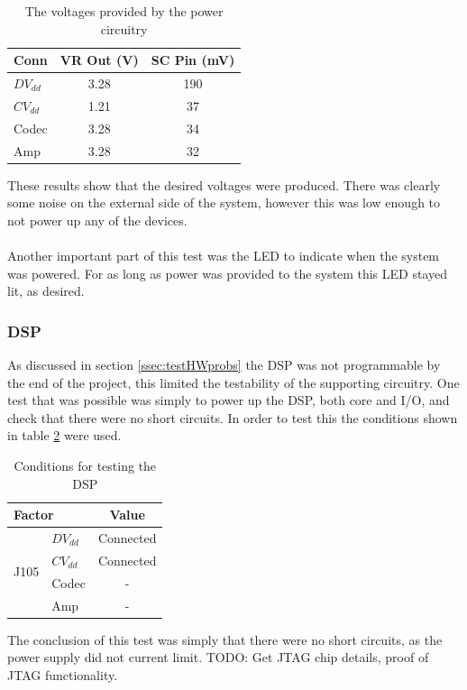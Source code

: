 \begin{table}[H]
	\centering
	\begin{tabular}[c]{| l | c | c |}
		\hline
		Conn		& VR Out (V)	& SC Pin (mV)	\\
		\hline
		$DV_{dd}$	& 3.28		& 190		\\
		$CV_{dd}$	& 1.21		& 37		\\
		Codec		& 3.28		& 34		\\
		Amp		& 3.28		& 32		\\
		\hline
	\end{tabular}
	\caption{The voltages provided by the power circuitry}
	\label{tab:powisotest}
\end{table}

\noindent These results show that the desired voltages were produced.
There was clearly some noise on the external side of the system, however this was low enough to not power up any of the devices.
\\
\\
Another important part of this test was the LED to indicate when the system was powered.
For as long as power was provided to the system this LED stayed lit, as desired.

\subsubsection{DSP}
As discussed in section \ref{ssec:testHWprobs} the DSP was not programmable by the end of the project, this limited the testability of the supporting circuitry.
One test that was possible was simply to power up the DSP, both core and I/O, and check that there were no short circuits.
In order to test this the conditions shown in table \ref{tab:dsptestconditions} were used.

\begin{table}[H]
	\centering
	\begin{tabular}[c]{| l | l | c |}
		\hline
		\multicolumn{2}{|l|}{Factor}		& Value	\\
		\hline
		\multirow{4}{*}{J105}	& $DV_{dd}$	& Connected	\\
					& $CV_{dd}$	& Connected	\\
					& Codec		& -		\\
					& Amp		& -		\\
		\hline
	\end{tabular}
	\caption{Conditions for testing the DSP}
	\label{tab:dsptestconditions}
\end{table}

\noindent The conclusion of this test was simply that there were no short circuits, as the power supply did not current limit.
TODO: Get JTAG chip details, proof of JTAG functionality.

